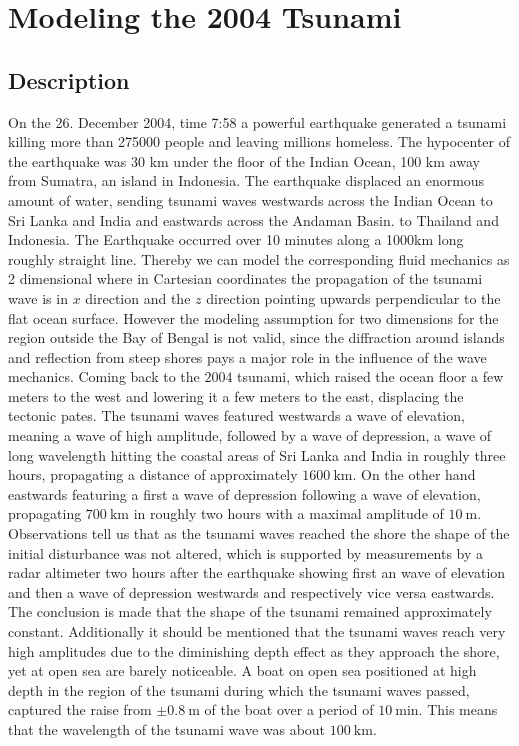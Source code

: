 \section{Modeling the 2004 Tsunami}
\subsection{Description}
On the 26. December 2004, time 7:58 a powerful earthquake generated a tsunami
killing more than 275000 people and leaving millions homeless. The
hypocenter of the earthquake was 30 km under the floor of the Indian Ocean,
100 km away from Sumatra, an island in Indonesia. The earthquake displaced
an enormous amount of water, sending tsunami waves westwards across the
Indian Ocean to Sri Lanka and India and eastwards across the Andaman Basin.
to Thailand and Indonesia. The Earthquake occurred over 10 minutes along a
1000km long roughly straight line. Thereby we can model the corresponding
fluid mechanics as 2 dimensional where in Cartesian coordinates the
propagation of the tsunami wave is in $x$ direction and the $z$ direction
pointing upwards perpendicular to the flat ocean surface. However the
modeling assumption for two dimensions for the region outside the Bay of
Bengal is not valid, since the diffraction around islands and reflection from
steep shores pays a major role in the influence of the wave mechanics. Coming
back to the $2004$ tsunami, which raised the ocean floor a few meters to the
west and lowering it a few meters to the east, displacing the tectonic pates.
The tsunami waves featured westwards a wave of elevation, meaning a wave of
high amplitude, followed by a wave of depression, a wave of long wavelength
hitting the coastal areas of Sri Lanka and India in roughly three hours,
propagating a distance of approximately $1600\ \text{km}$. On the other hand
eastwards featuring a first a wave of depression following a wave of
elevation, propagating $700\ \text{km}$ in roughly two hours with a maximal
amplitude of $10\ \text{m}$. Observations tell us that as the tsunami waves
reached the shore the shape of the initial disturbance was not altered, which
is supported by measurements by a radar altimeter two hours after the
earthquake showing first an wave of elevation and then a wave of depression
westwards and respectively vice versa eastwards. The conclusion is made that
the shape of the tsunami remained approximately constant. Additionally it
should be mentioned that the tsunami waves reach very high amplitudes due to
the diminishing depth effect as they approach the shore, yet at open sea are
barely noticeable. A boat on open sea positioned at high depth in the region
of the tsunami during which the tsunami waves passed, captured the raise
from $\pm 0.8\ \text{m}$ of the boat over a period of $10\ \text{min}$.
This means that the wavelength of the tsunami wave was about $100\
\text{km}$.
